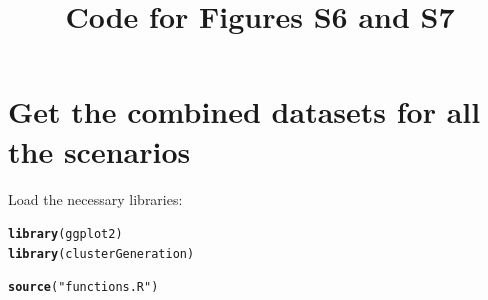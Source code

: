 \documentclass{article}\usepackage[]{graphicx}\usepackage[]{color}
\title{Code for Figures S6 and S7}
\makeatletter
\newcommand{\hlstr}[1]{\textcolor[rgb]{0.192,0.494,0.8}{#1}}%
\newcommand{\hlstd}[1]{\textcolor[rgb]{0.345,0.345,0.345}{#1}}%
\newcommand{\hlkwd}[1]{\textcolor[rgb]{0.737,0.353,0.396}{\textbf{#1}}}%
\newenvironment{kframe}{%
 \def\at@end@of@kframe{}%
 \ifinner\ifhmode%
  \def\at@end@of@kframe{\end{minipage}}%
  \begin{minipage}{\columnwidth}%
 \fi\fi%
 \def\FrameCommand##1{\hskip\@totalleftmargin \hskip-\fboxsep
 \colorbox{shadecolor}{##1}\hskip-\fboxsep
     \hskip-\linewidth \hskip-\@totalleftmargin \hskip\columnwidth}%
 \MakeFramed {\advance\hsize-\width
   \@totalleftmargin\z@ \linewidth\hsize
   \@setminipage}}%
 {\par\unskip\endMakeFramed%
 \at@end@of@kframe}
\newenvironment{knitrout}{}{} %
\makeatother
\begin{document}
\maketitle



\section{Get the combined datasets for all the scenarios}

Load the necessary libraries:
\begin{knitrout}
\color{fgcolor}\begin{kframe}
\begin{alltt}
\hlkwd{library}\hlstd{(ggplot2)}
\hlkwd{library}\hlstd{(clusterGeneration)}
\end{alltt}


{\ttfamily\noindent\itshape\color{messagecolor}{\#\# Loading required package: MASS}}\begin{alltt}
\hlkwd{source}\hlstd{(}\hlstr{"functions.R"}\hlstd{)}
\end{alltt}
\end{kframe}
\end{knitrout}
\end{document}

